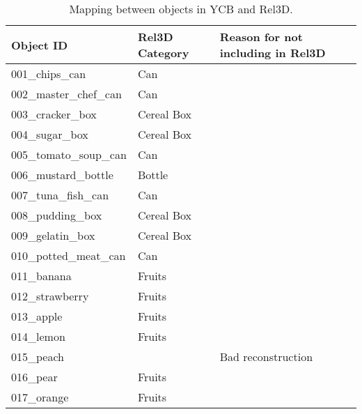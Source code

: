 \documentclass{article}
\begin{document}
\begin{longtable}{|l|l|l|}
\caption{Mapping between objects in YCB and Rel3D.} \\
\hline
Object ID                    & Rel3D Category & Reason for not including in Rel3D     \\ \hline
001\_chips\_can              & Can            &                                       \\ \hline
002\_master\_chef\_can       & Can            &                                       \\ \hline
003\_cracker\_box            & Cereal Box     &                                       \\ \hline
004\_sugar\_box              & Cereal Box     &                                       \\ \hline
005\_tomato\_soup\_can       & Can            &                                       \\ \hline
006\_mustard\_bottle         & Bottle         &                                       \\ \hline
007\_tuna\_fish\_can         & Can            &                                       \\ \hline
008\_pudding\_box            & Cereal Box     &                                       \\ \hline
009\_gelatin\_box            & Cereal Box     &                                       \\ \hline
010\_potted\_meat\_can       & Can            &                                       \\ \hline
011\_banana                  & Fruits         &                                       \\ \hline
012\_strawberry              & Fruits         &                                       \\ \hline
013\_apple                   & Fruits         &                                       \\ \hline
014\_lemon                   & Fruits         &                                       \\ \hline
015\_peach                   &                & Bad reconstruction                    \\ \hline
016\_pear                    & Fruits         &                                       \\ \hline
017\_orange                  & Fruits         &                                       \\ \hline

\end{longtable}
\end{document}
